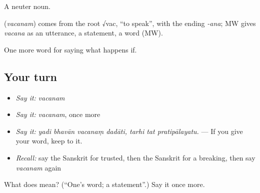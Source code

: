 A neuter noun.

\begin{cousinweb}
\textbf{} (\emph{vacanam}) comes from the root √vac, \textquotedblleft{}to speak\textquotedblright{}, with the ending \emph{-ana}; MW gives \emph{vacana} as an utterance, a statement, a word (MW).
\end{cousinweb}

\begin{grammarlens}[title={What you've built}]
One more word for saying what happens if.
\end{grammarlens}

\subsection*{Your turn}
\begin{itemize}
\raggedright
  \item \emph{Say it:} \emph{vacanam}
  \item \emph{Say it:} \emph{vacanam}, once more
  \item \emph{Say it:} \emph{yadi bhavān vacanaṃ dadāti, tarhi tat pratipālayatu.} — If you give your word, keep to it.
  \item \emph{Recall:} say the Sanskrit for trusted, then the Sanskrit for a breaking, then say \emph{vacanam} again
\end{itemize}

\begin{tcolorbox}[breakable,colback=teal!4,colframe=teal!35!black,title={Before you move on}]
What does  mean? (\textquotedblleft{}One's word; a statement\textquotedblright{}.) Say it once more.
\end{tcolorbox}
